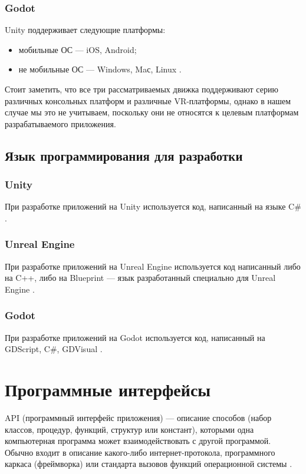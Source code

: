 \subsubsection{Godot}
Unity поддерживает следующие платформы:
\begin{itemize}
\item мобильные ОС --- iOS, Android;
\item не мобильные ОС --- Windows, Maс, Linux \cite{godot_comp}.
\end{itemize}

Стоит заметить, что все три рассматриваемых движка поддерживают серию различных консольных платформ и различные VR-платформы, однако в нашем случае мы это не учитываем, поскольку они не относятся к целевым платформам разрабатываемого приложения.

\subsection{Язык программирования для разработки}
\subsubsection{Unity}
При разработке приложений на Unity используется код, написанный на языке C\# \cite{unity}.
\subsubsection{Unreal Engine}
При разработке приложений на Unreal Engine используется код написанный либо на C++, либо на Blueprint --- язык разработанный специально для Unreal Engine \cite{unreal}.
\subsubsection{Godot}
При разработке приложений на Godot используется код, написанный на GDScript, C\#, GDVisual \cite{godot}.

\section{Программные интерфейсы}
API (программный интерфейс приложения) --- описание способов (набор классов, процедур, функций, структур или констант), которыми одна компьютерная программа может взаимодействовать с другой программой. Обычно входит в описание какого-либо интернет-протокола, программного каркаса (фреймворка) или стандарта вызовов функций операционной системы \cite{linux}.

